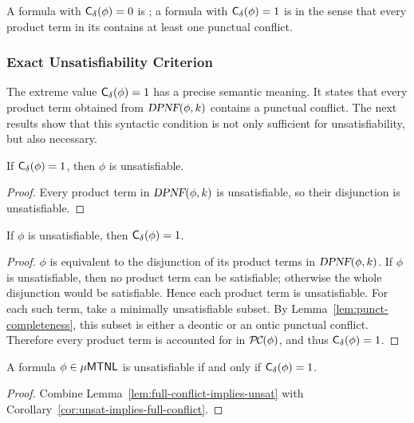 A formula with $\mathsf{C_\delta} (\phi)=0$ is ; a formula with $\mathsf{C_\delta} (\phi)=1$ is  in the sense that every product term in its \dpnf contains at least one punctual conflict.

\subsubsection{Exact Unsatisfiability Criterion}

The extreme value \(\mathsf{C_\delta} (\phi)=1\) has a precise semantic meaning. It states that every product term obtained from \(\textsl{DPNF}(\phi,k)\) contains a punctual conflict. The next results show that this syntactic condition is not only sufficient for unsatisfiability, but also necessary.

\begin{lemma}\label{lem:full-conflict-implies-unsat}
If \(\mathsf{C_\delta} (\phi)=1\), then \(\phi\) is unsatisfiable.
\end{lemma}

\begin{proof}
Every product term in \(\textsl{DPNF}(\phi,k)\) is unsatisfiable, so their disjunction is unsatisfiable.
\end{proof}

\begin{corollary}\label{cor:unsat-implies-full-conflict}
If \(\phi\) is unsatisfiable, then \(\mathsf{C_\delta} (\phi)=1\).
\end{corollary}

\begin{proof}
\(\phi\) is equivalent to the disjunction of its product terms in \(\textsl{DPNF}(\phi,k)\). If \(\phi\) is unsatisfiable, then no product term can be satisfiable; otherwise the whole disjunction would be satisfiable. Hence each product term is unsatisfiable. For each such term, take a minimally unsatisfiable subset. By Lemma~\ref{lem:punct-completeness}, this subset is either a deontic or an ontic punctual conflict. Therefore every product term is accounted for in \(\mathcall{PC}(\phi)\), and thus \(\mathsf{C_\delta} (\phi)=1\).
\end{proof}

\begin{theorem}\label{thm:exact-unsat}
A formula \(\phi\in\mathsf{\mu MTNL}\) is unsatisfiable if and only if \(\mathsf{C_\delta} (\phi)=1\).
\end{theorem}

\begin{proof}
Combine Lemma~\ref{lem:full-conflict-implies-unsat} with Corollary~\ref{cor:unsat-implies-full-conflict}.
\end{proof}

